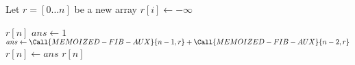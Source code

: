 \begin{algorithmic}
\State Let \(r = [0 \dots n]\) be a new array
  \State \(r[i] \leftarrow -\infty\)
\EndFor
\State \Return {}
\EndFunction
\end{algorithmic}

\begin{algorithmic}
  \State \Return \(r[n]\)
\EndIf
{}
  \State \(ans \leftarrow 1\)
\Else
  \State \(ans \leftarrow \Call{MEMOIZED-FIB-AUX}{n-1, r} + \Call{MEMOIZED-FIB-AUX}{n-2, r}\)
\EndIf
\State \(r[n] \leftarrow ans\)
\State \Return \(r[n]\)
\EndFunction
\end{algorithmic}